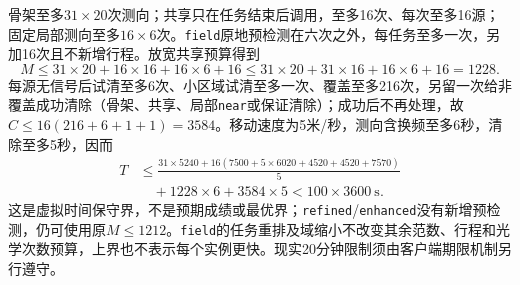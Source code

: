 骨架至多$31\times20$次测向；共享只在任务结束后调用，至多16次、每次至多16源；固定局部测向至多$16\times6$次。\texttt{field}原地预检测在六次之外，每任务至多一次，另加16次且不新增行程。放宽共享预算得到
\[
 M\le31\times20+16\times16+16\times6+16
 \le31\times20+31\times16+16\times6+16=1228.
\]
每源无信号后试清至多6次、小区域试清至多一次、覆盖至多216次，另留一次给非覆盖成功清除（骨架、共享、局部\texttt{near}或保证清除）；成功后不再处理，故$C\le16(216+6+1+1)=3584$。移动速度为5米/秒，测向含换频至多6秒，清除至多5秒，因而
\begin{equation}
 \begin{split}
 T&\le\frac{31\times5240+
 16(7500+5\times6020+4520+4520+7570)}5\\
 &\quad+1228\times6+3584\times5
 <100\times3600\ \mathrm{s}.
 \end{split}
\end{equation}
这是虚拟时间保守界，不是预期成绩或最优界；\texttt{refined}/\texttt{enhanced}没有新增预检测，仍可使用原$M\le1212$。\texttt{field}的任务重排及域缩小不改变其余范数、行程和光学次数预算，上界也不表示每个实例更快。现实20分钟限制须由客户端期限机制另行遵守。
